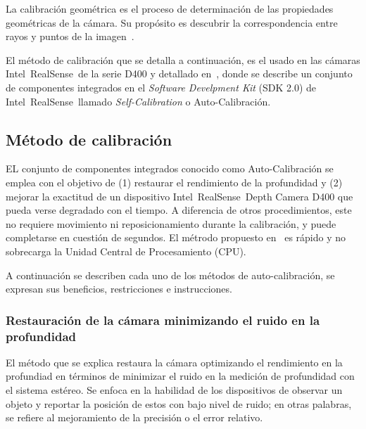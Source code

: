 \begin{definition}
	La calibración geométrica es el proceso de determinación de las propiedades geométricas de la cámara. Su propósito es descubrir la correspondencia entre rayos y puntos de la imagen~\cite{kannala2008geometric}.
\end{definition}

El método de calibración que se detalla a continuación, es el usado en las cámaras Intel\textregistered~RealSense\texttrademark~de la serie D400 y detallado en~\cite{grunnet2021intel}, donde se describe un conjunto de componentes integrados en el \textit{Software Develpment Kit} (SDK 2.0) de Intel\textregistered~RealSense\texttrademark~llamado \textit{Self-Calibration} o Auto-Calibración. 

\subsection{Método de calibración}

EL conjunto de componentes integrados conocido como Auto-Calibración se emplea con el objetivo de (1) restaurar el rendimiento de la profundidad y (2) mejorar la exactitud de un dispositivo Intel\textregistered~RealSense\texttrademark~Depth Camera D400 que pueda verse degradado con el tiempo. A diferencia de otros procedimientos, este no requiere movimiento ni reposicionamiento durante la calibración, y puede completarse en cuestión de segundos. El métrodo propuesto en~\cite{grunnet2021intel} es rápido y no sobrecarga la Unidad Central de Procesamiento (CPU).

A continuación se describen cada uno de los métodos de auto-calibración, se expresan sus beneficios, restricciones e instrucciones.

\subsubsection{Restauración de la cámara minimizando el ruido en la profundidad}

El método que se explica restaura la cámara optimizando el rendimiento en la profundiad en términos de minimizar el ruido en la medición de profundidad con el sistema estéreo. Se enfoca en la habilidad de los dispositivos de observar un objeto y reportar la posición de estos con bajo nivel de ruido; en otras palabras, se refiere al mejoramiento de la precisión o el error relativo.

